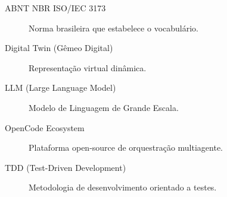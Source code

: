 
\begin{description}
    \item[ABNT NBR ISO/IEC 3173] Norma brasileira que estabelece o vocabulário.
    \item[Digital Twin (Gêmeo Digital)] Representação virtual dinâmica.
    \item[LLM (Large Language Model)] Modelo de Linguagem de Grande Escala.
    \item[OpenCode Ecosystem] Plataforma open-source de orquestração multiagente.
    \item[TDD (Test-Driven Development)] Metodologia de desenvolvimento orientado a testes.
\end{description}